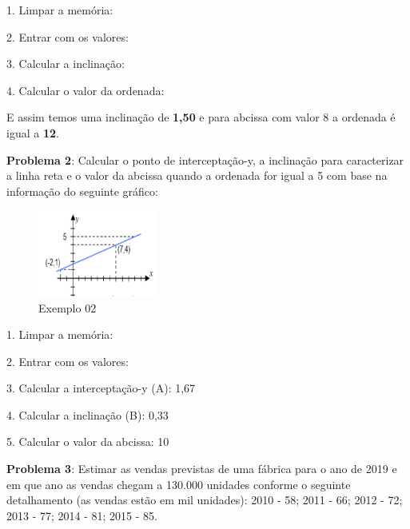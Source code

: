1. Limpar a memória:  \keystroke{$\sum$}

2. Entrar com os valores:    \keystroke{$\sum+$}    \keystroke{$\sum+$}

3. Calcular a inclinação:   

4. Calcular o valor da ordenada:    

E assim temos uma inclinação de \textbf{1,50} e para abcissa com valor 8 a ordenada é igual a \textbf{12}.

\textbf{Problema 2}: Calcular o ponto de interceptação-y, a inclinação para caracterizar a linha reta e o valor da abcissa quando a ordenada for igual a 5 com base na informação do seguinte gráfico:
\begin{figure}[H]
	\centering
	\includegraphics[width=0.35\textwidth]{images/reta02}
	\caption{Exemplo 02}
\end{figure}

1. Limpar a memória: \\
 \keystroke{$\sum$}

2. Entrar com os valores: \\
    \keystroke{$\sum+$}    \keystroke{$\sum+$}

3. Calcular a interceptação-y (A): 1,67 \\
  

4. Calcular a inclinação (B): 0,33 \\
      \keystroke{$-$}

5. Calcular o valor da abcissa: 10 \\
   

\textbf{Problema 3}: Estimar as vendas previstas de uma fábrica para o ano de 2019 e em que ano as vendas chegam a 130.000 unidades conforme o seguinte detalhamento (as vendas estão em mil unidades): 2010 - 58; 2011 - 66; 2012 - 72; 2013 - 77; 2014 - 81; 2015 - 85.

